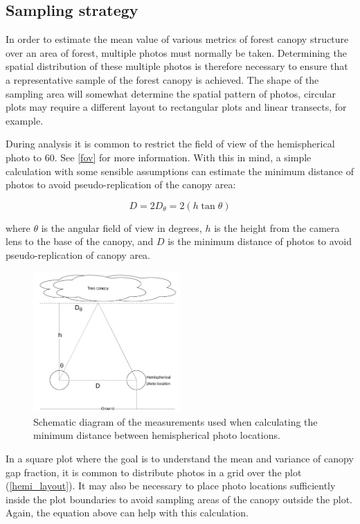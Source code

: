 \documentclass[11pt,a4paper]{article}
\begin{document}
\subsection{Sampling strategy}

In order to estimate the mean value of various metrics of forest canopy structure over an area of forest, multiple photos must normally be taken. Determining the spatial distribution of these multiple photos is therefore necessary to ensure that a representative sample of the forest canopy is achieved. The shape of the sampling area will somewhat determine the spatial pattern of photos, circular plots may require a different layout to rectangular plots and linear transects, for example.

During analysis it is common to restrict the field of view of the hemispherical photo to 60\textdegree{}. See \autoref{fov} for more information. With this in mind, a simple calculation with some sensible assumptions can estimate the minimum distance of photos to avoid pseudo-replication of the canopy area:

\begin{equation}
	D = 2D_{\theta} = 2(h \tan{\theta})
\end{equation}

where $\theta$ is the angular field of view in degrees, $h$ is the height from the camera lens to the base of the canopy, and $D$ is the minimum distance of photos to avoid pseudo-replication of canopy area.

\begin{figure}[H]
\centering
	\includegraphics[width=0.5\textwidth]{canopy_trig.drawio}
	\caption{Schematic diagram of the measurements used when calculating the minimum distance between hemispherical photo locations.}
	\label{canopy_trig}
\end{figure}

In a square plot where the goal is to understand the mean and variance of canopy gap fraction, it is common to distribute photos in a grid over the plot (\autoref{hemi_layout}). It may also be necessary to place photo locations sufficiently inside the plot boundaries to avoid sampling areas of the canopy outside the plot. Again, the equation above can help with this calculation.
\end{document}
